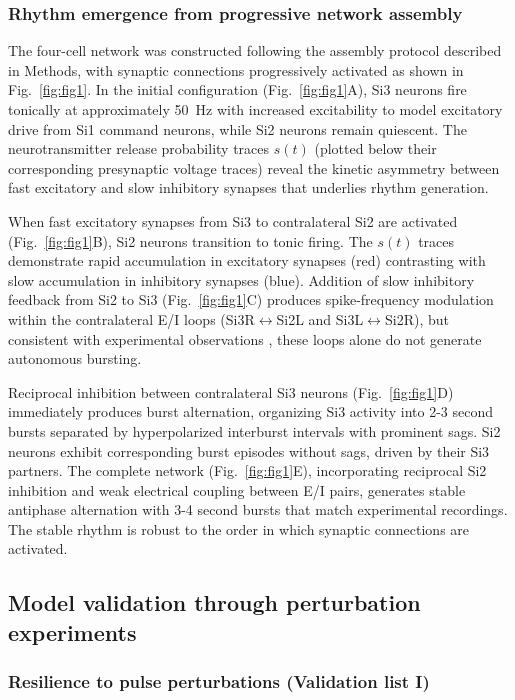 \documentclass[nofootinbib,aip,amsmath,amssymb,preprint,twocolumn,floatfix,10pt]{revtex4-2}
\begin{document}
\subsubsection{Rhythm emergence from progressive network assembly}
%
The four-cell network was constructed following the assembly protocol described in Methods, with synaptic connections progressively activated as shown in Fig.~\ref{fig:fig1}. In the initial configuration (Fig.~\ref{fig:fig1}A), Si3 neurons fire tonically at approximately 50~Hz with increased excitability to model excitatory drive from Si1 command neurons, while Si2 neurons remain quiescent. The neurotransmitter release probability traces $s(t)$ (plotted below their corresponding presynaptic voltage traces) reveal the kinetic asymmetry between fast excitatory and slow inhibitory synapses that underlies rhythm generation. 

When fast excitatory synapses from Si3 to contralateral Si2 are activated (Fig.~\ref{fig:fig1}B), Si2 neurons transition to tonic firing. The $s(t)$ traces demonstrate rapid accumulation in excitatory synapses (red) contrasting with slow accumulation in inhibitory synapses (blue). Addition of slow inhibitory feedback from Si2 to Si3 (Fig.~\ref{fig:fig1}C) produces spike-frequency modulation within the contralateral E/I loops (Si3R$\leftrightarrow$Si2L and Si3L$\leftrightarrow$Si2R), but consistent with experimental observations \cite{SakuraiKatz2016}, these loops alone do not generate autonomous bursting. 

Reciprocal inhibition between contralateral Si3 neurons (Fig.~\ref{fig:fig1}D) immediately produces burst alternation, organizing Si3 activity into 2-3 second bursts separated by hyperpolarized interburst intervals with prominent sags. Si2 neurons exhibit corresponding burst episodes without sags, driven by their Si3 partners. The complete network (Fig.~\ref{fig:fig1}E), incorporating reciprocal Si2 inhibition and weak electrical coupling between E/I pairs, generates stable antiphase alternation with 3-4 second bursts that match experimental recordings. The stable rhythm is robust to the order in which synaptic connections are activated.

\subsection{Model validation through perturbation experiments}

\subsubsection{Resilience to pulse perturbations (Validation list I)}
\end{document}
